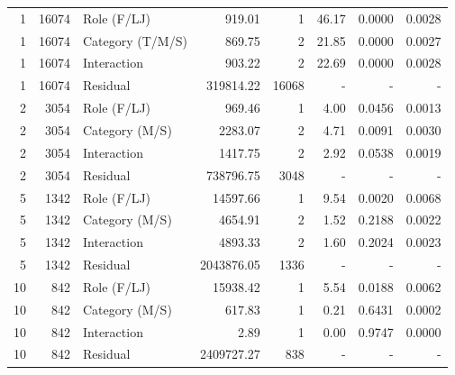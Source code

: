 \begin{table}[H]
\begin{tabular}{r r l r r r r r}
\midrule
1 & 16074 & Role (F/LJ) & 919.01 & 1 & 46.17 & 0.0000 & 0.0028 \\ 
1 & 16074 & Category (T/M/S) & 869.75 & 2 & 21.85 & 0.0000 & 0.0027 \\ 
1 & 16074 & Interaction & 903.22 & 2 & 22.69 & 0.0000 & 0.0028 \\ 
1 & 16074 & Residual & 319814.22 & 16068 & - & - & -   \\ 
2 & 3054 & Role (F/LJ) & 969.46 & 1 & 4.00 & 0.0456 & 0.0013 \\ 
2 & 3054 & Category (M/S) & 2283.07 & 2 & 4.71 & 0.0091 & 0.0030 \\ 
2 & 3054 & Interaction & 1417.75 & 2 & 2.92 & 0.0538 & 0.0019 \\ 
2 & 3054 & Residual & 738796.75 & 3048 & - & - & -   \\ 
5 & 1342 & Role (F/LJ) & 14597.66 & 1 & 9.54 & 0.0020 & 0.0068 \\ 
5 & 1342 & Category (M/S) & 4654.91 & 2 & 1.52 & 0.2188 & 0.0022 \\ 
5 & 1342 & Interaction & 4893.33 & 2 & 1.60 & 0.2024 & 0.0023 \\ 
5 & 1342 & Residual & 2043876.05 & 1336 & - & - & -   \\ 
10 & 842 & Role (F/LJ) & 15938.42 & 1 & 5.54 & 0.0188 & 0.0062 \\ 
10 & 842 & Category (M/S) & 617.83 & 1 & 0.21 & 0.6431 & 0.0002 \\ 
10 & 842 & Interaction & 2.89 & 1 & 0.00 & 0.9747 & 0.0000 \\ 
10 & 842 & Residual & 2409727.27 & 838 & - & - & -   \\ 
\bottomrule
\end{tabular}%
\label{tab:standard_anova_classes} 
\end{table}
\newpage 
